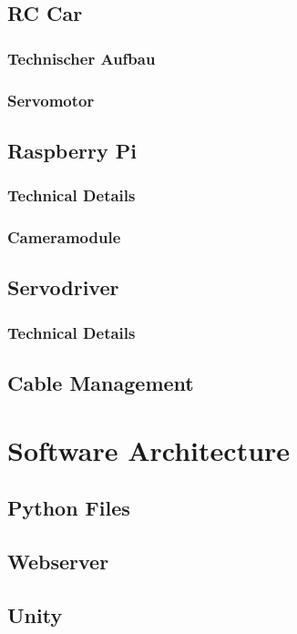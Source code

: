 \documentclass[journal]{IEEEtran}
\begin{document}
\subsection{RC Car}
\subsubsection{Technischer Aufbau}
\subsubsection{Servomotor}

\subsection{Raspberry Pi}
\subsubsection{Technical Details}
\subsubsection{Cameramodule}

\subsection{Servodriver}
\subsubsection{Technical Details}

\subsection{Cable Management}

\section{Software Architecture}

\subsection{Python Files}
\subsection{Webserver}
\subsection{Unity}
\end{document}
